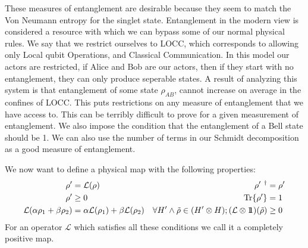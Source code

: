 These measures of entanglement are desirable because they seem to match the Von Neumann entropy for the singlet state. Entanglement in the modern view is considered a resource with which we can bypass some of our normal physical rules.
We say that we restrict ourselves to LOCC, which corresponds to allowing only Local qubit Operations, and Classical Communication.
In this model our actors are restricted, if Alice and Bob are our actors, then if they start with no entanglement, they can only produce seperable states.
A result of analyzing this system is that entanglement of some state $\rho_{AB}$, cannot increase on average in the confines of LOCC.
This puts restrictions on any measure of entanglement that we have access to. This can be terribly difficult to prove for a given measurement of entanglement. We also impose the condition that the entanglement of a Bell state should be 1.
We can also use the number of terms in our Schmidt decomposition as a good measure of entanglement.

We now want to define a physical map with the following properties:
\begin{align*}
	\rho' &= \mathcal{L}(\rho) &
	\rho'\ ^\dagger &= \rho' \\
	\rho' &\geq 0 &
	\Tr{\rho'} &= 1 \\
	\mathcal{L}(\alpha\rho_1 + \beta\rho_2) &= \alpha \mathcal{L}(\rho_1) + \beta\mathcal{L}(\rho_2) &
	\forall H' \land \tilde{\rho} \in (H' \otimes H); (\mathcal{L} \otimes 1\!\!1)(\tilde{\rho}) &\geq 0
\end{align*}
For an operator $\mathcal{L}$ which satisfies all these conditions we call it a completely positive map.


